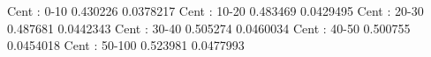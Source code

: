 Cent : 0-10
0.430226 0.0378217
Cent : 10-20
0.483469 0.0429495
Cent : 20-30
0.487681 0.0442343
Cent : 30-40
0.505274 0.0460034
Cent : 40-50
0.500755 0.0454018
Cent : 50-100
0.523981 0.0477993
